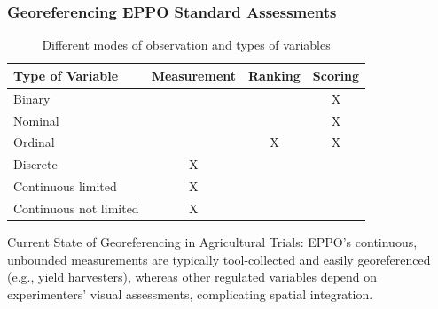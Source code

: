 \documentclass[aspectratio=43]{beamer}
\begin{document}
\begin{frame}
    \frametitle{Georeferencing EPPO Standard Assessments}
    
    \begin{table}[ht]
        \caption{\small Different modes of observation and types of variables}
        \label{tab:data_types_slide}
        \centering
        \begin{tabular}{|l|c|c|c|}
        \hline
        \textbf{Type of Variable} & \textbf{Measurement} & \textbf{Ranking} & \textbf{Scoring} \\
        \hline
        \rowcolor{red!20} Binary & & & X \\
        \hline
        \rowcolor{red!20} Nominal & & & X \\
        \hline
        \rowcolor{red!20} Ordinal & & X & X \\
        \hline
        \rowcolor{red!20} Discrete & X & & \\
        \hline
        \rowcolor{red!20} Continuous limited & X & & \\
        \hline
        \rowcolor{green!20} Continuous not limited & X & & \\
        \hline
        \end{tabular}
        \end{table}
        
    \begin{flushleft}
        \hspace{1.5cm}{\tiny Summary from EPPO PP 1/152: Design and analysis of efficacy evaluation trials}
    \end{flushleft}
    
    \vspace{1em}
    
    \begin{block}{Current State of Georeferencing in Agricultural Trials:}
        \small EPPO's continuous, unbounded measurements are typically tool-collected and easily georeferenced (e.g., yield harvesters), whereas other regulated variables depend on experimenters' visual assessments, complicating spatial integration.
    \end{block}
\end{frame}
\end{document}
